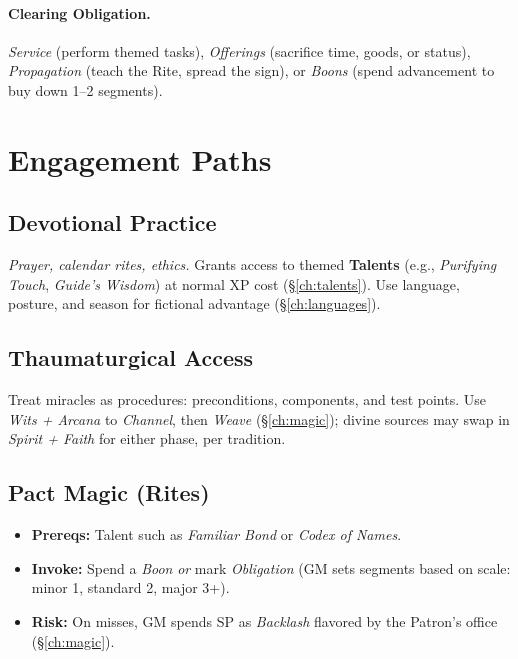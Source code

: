 \begin{multicols}{2}
\paragraph{Clearing Obligation.}
\emph{Service} (perform themed tasks), \emph{Offerings} (sacrifice time, goods, or status), \emph{Propagation} (teach the Rite, spread the sign), or \emph{Boons} (spend advancement to buy down 1--2 segments).

\section{Engagement Paths}

\subsection*{Devotional Practice}
\emph{Prayer, calendar rites, ethics.} Grants access to themed \textbf{Talents} (e.g., \emph{Purifying Touch}, \emph{Guide’s Wisdom}) at normal XP cost (\S\ref{ch:talents}). Use language, posture, and season for fictional advantage (\S\ref{ch:languages}).

\subsection*{Thaumaturgical Access}
Treat miracles as procedures: preconditions, components, and test points. Use \emph{Wits + Arcana} to \emph{Channel}, then \emph{Weave} (\S\ref{ch:magic}); divine sources may swap in \emph{Spirit + Faith} for either phase, per tradition.

\subsection*{Pact Magic (Rites)}
\begin{itemize}
  \item \textbf{Prereqs:} Talent such as \emph{Familiar Bond} or \emph{Codex of Names}. 
  \item \textbf{Invoke:} Spend a \emph{Boon} \emph{or} mark \emph{Obligation} (GM sets segments based on scale: minor 1, standard 2, major 3+).
  \item \textbf{Risk:} On misses, GM spends SP as \emph{Backlash} flavored by the Patron’s office (\S\ref{ch:magic}).
\end{itemize}


\end{multicols}
